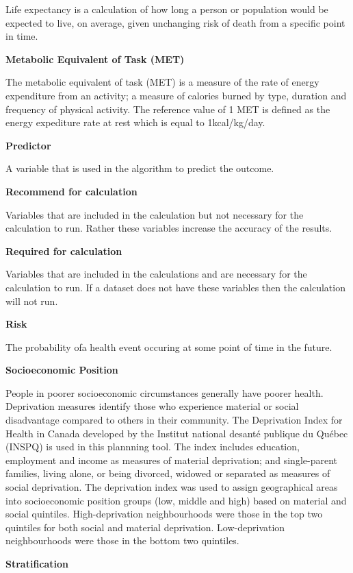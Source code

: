 \documentclass[]{book}
\begin{document}
Life expectancy is a calculation of how long a person or
population would be expected to live, on average, given unchanging risk
of death from a specific point in time.

\textbf{Metabolic Equivalent of Task (MET)}

The metabolic equivalent of task (MET) is a measure of the rate of
energy expenditure from an activity; a measure of calories burned by
type, duration and frequency of physical activity. The reference value
of 1 MET is defined as the energy expediture rate at rest which is equal
to 1kcal/kg/day.

\textbf{Predictor}

A variable that is used in the algorithm to predict the outcome.

\textbf{Recommend for calculation}

Variables that are included in the calculation but not necessary for the
calculation to run. Rather these variables increase the accuracy of the
results.

\textbf{Required for calculation}

Variables that are included in the calculations and are necessary for
the calculation to run. If a dataset does not have these variables then
the calculation will not run.

\textbf{Risk}

The probability ofa health event occuring at some point of time in the
future.

\textbf{Socioeconomic Position}

People in poorer socioeconomic circumstances generally have poorer
health. Deprivation measures identify those who experience material or
social disadvantage compared to others in their community. The
Deprivation Index for Health in Canada developed by the Institut
national desanté publique du Québec (INSPQ)\citep{INSPQ2000} is used in
this plannning tool. The index includes education, employment and income
as measures of material deprivation; and single-parent families, living
alone, or being divorced, widowed or separated as measures of social
deprivation. The deprivation index was used to assign geographical areas
into socioeconomic position groups (low, middle and high) based on
material and social quintiles. High-deprivation neighbourhoods were
those in the top two quintiles for both social and material deprivation.
Low-deprivation neighbourhoods were those in the bottom two quintiles.

\textbf{Stratification}
\end{document}
